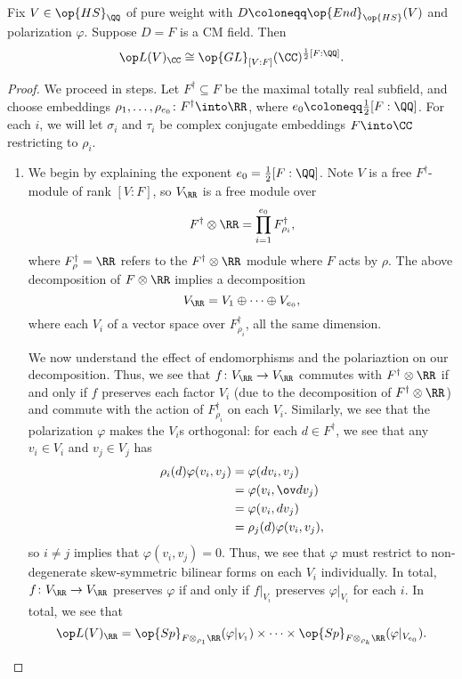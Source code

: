 \documentclass[../thesis.tex]{subfiles}
\begin{document}
\begin{lemma} \label{lem:lefschetz-type-iv-1}
	Fix $V\in\op{HS}_\QQ$ of pure weight with $D\coloneqq\op{End}_{\op{HS}}(V)$ and polarization $\varphi$. Suppose $D=F$ is a CM field. Then
	\[\op L(V)_\CC\cong\op{GL}_{[V:F]}(\CC)^{\frac12[F:\QQ]}.\]
\end{lemma}
\begin{proof}
	We proceed in steps. Let $F^\dagger\subseteq F$ be the maximal totally real subfield, and choose embeddings $\rho_1,\ldots,\rho_{e_0}\colon F^\dagger\into\RR$, where $e_0\coloneqq\frac12[F:\QQ]$. For each $i$, we will let $\sigma_i$ and $\tau_i$ be complex conjugate embeddings $F\into\CC$ restricting to $\rho_i$.
	\begin{enumerate}
		\item We begin by explaining the exponent $e_0=\frac12[F:\QQ]$. Note $V$ is a free $F^\dagger$-module of rank $[V:F]$, so $V_\RR$ is a free module over
		\[F^\dagger\otimes\RR=\prod_{i=1}^{e_0}F_{\rho_i}^\dagger,\]
		where $F_{\rho}^\dagger=\RR$ refers to the $F^\dagger\otimes\RR$ module where $F$ acts by $\rho$. The above decomposition of $F\otimes\RR$ implies a decomposition
		\[V_\RR=V_1\oplus\cdots\oplus V_{e_0},\]
		where each $V_i$ of a vector space over $F^\dagger_{\rho_i}$, all the same dimension.
		
		We now understand the effect of endomorphisms and the polariaztion on our decomposition. Thus, we see that $f\colon V_\RR\to V_\RR$ commutes with $F^\dagger\otimes\RR$ if and only if $f$ preserves each factor $V_i$ (due to the decomposition of $F^\dagger\otimes\RR$) and commute with the action of $F^\dagger_{\rho_i}$ on each $V_i$. Similarly, we see that the polarization $\varphi$ makes the $V_i$s orthogonal: for each $d\in F^\dagger$, we see that any $v_i\in V_i$ and $v_j\in V_j$ has
		\begin{align*}
			\rho_i(d)\varphi(v_i,v_j) &= \varphi(dv_i,v_j) \\
			&= \varphi(v_i,\ov dv_j) \\
			&= \varphi(v_i,dv_j) \\
			&= \rho_j(d)\varphi(v_i,v_j),
		\end{align*}
		so $i\ne j$ implies that $\varphi(v_i,v_j)=0$. Thus, we see that $\varphi$  must restrict to non-degenerate skew-symmetric bilinear forms on each $V_i$ individually. In total, $f\colon V_\RR\to V_\RR$ preserves $\varphi$ if and only if $f|_{V_i}$ preserves $\varphi|_{V_i}$ for each $i$. In total, we see that
		\[\op L(V)_\RR=\op{Sp}_{F\otimes_{\rho_1}\RR}(\varphi|_{V_1})\times\cdots\times\op{Sp}_{F\otimes_{\rho_k}\RR}(\varphi|_{V_{e_0}}).\]


\end{enumerate}
\end{proof}
\end{document}
